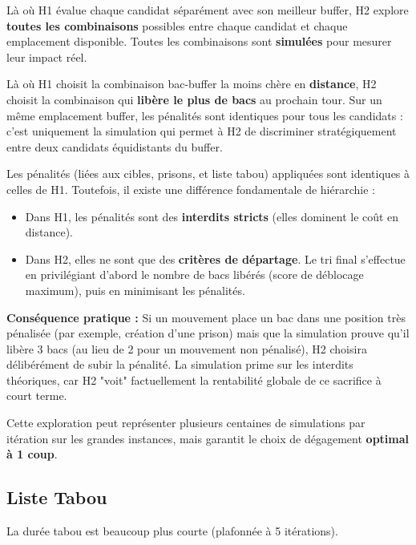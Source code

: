 \documentclass[12pt,a4paper]{article}
\begin{document}
Là où H1 évalue chaque candidat séparément avec son meilleur buffer,
H2 explore \textbf{toutes les combinaisons} possibles entre chaque candidat et chaque emplacement disponible.
Toutes les combinaisons sont \textbf{simulées} pour mesurer leur impact réel.

\begin{tcolorbox}[colback=gris, colframe=vertH2, fonttitle=\bfseries, title=Avantage H2 sur H1 en phase Deadlock]
Là où H1 choisit la combinaison bac-buffer la moins chère en \textbf{distance},
H2 choisit la combinaison qui \textbf{libère le plus de bacs} au prochain tour.
Sur un même emplacement buffer, les pénalités sont identiques pour tous les candidats :
c'est uniquement la simulation qui permet à H2 de discriminer stratégiquement
entre deux candidats équidistants du buffer.
\end{tcolorbox}

Les pénalités (liées aux cibles, prisons, et liste tabou) appliquées sont identiques à celles de H1. Toutefois, il existe une différence fondamentale de hiérarchie :
\begin{itemize}[noitemsep]
  \item Dans H1, les pénalités sont des \textbf{interdits stricts} (elles dominent le coût en distance).
  \item Dans H2, elles ne sont que des \textbf{critères de départage}. Le tri final s'effectue en privilégiant d'abord le nombre de bacs libérés (score de déblocage maximum), puis en minimisant les pénalités.
\end{itemize}

\textbf{Conséquence pratique :} Si un mouvement place un bac dans une position très pénalisée (par exemple, création d'une prison) mais que la simulation prouve qu'il libère 3 bacs (au lieu de 2 pour un mouvement non pénalisé), H2 choisira délibérément de subir la pénalité. La simulation prime sur les interdits théoriques, car H2 "voit" factuellement la rentabilité globale de ce sacrifice à court terme.

Cette exploration peut représenter plusieurs centaines de simulations
par itération sur les grandes instances, mais garantit le choix de
dégagement \textbf{optimal à 1 coup}.

\subsection{Liste Tabou}

La durée tabou est beaucoup plus courte (plafonnée à 5 itérations).
\end{document}
